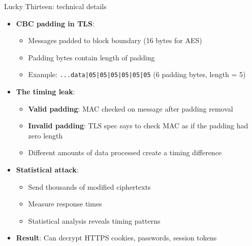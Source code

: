 \ifdefined\PRESENTATION\else\PassOptionsToClass{handout}{beamer}\fi\documentclass[aspectratio=169, lualatex]{beamer}
\begin{document}
\begin{frame}{Lucky Thirteen: technical details}
	\begin{itemize}
		\item \textbf{CBC padding in TLS}:
		      \begin{itemize}
			      \item Messages padded to block boundary (16 bytes for AES)
			      \item Padding bytes contain length of padding
			      \item Example: \texttt{...data|05|05|05|05|05|05} (6 padding bytes, length = 5)
		      \end{itemize}
		\item \textbf{The timing leak}:
		      \begin{itemize}
			      \item \textbf{Valid padding}: MAC checked on message after padding removal
			      \item \textbf{Invalid padding}: TLS spec says to check MAC as if the padding had zero length
			      \item Different amounts of data processed create a timing difference
		      \end{itemize}
		\item \textbf{Statistical attack}:
		      \begin{itemize}
			      \item Send thousands of modified ciphertexts
			      \item Measure response times
			      \item Statistical analysis reveals timing patterns
		      \end{itemize}
		\item \textbf{Result}: Can decrypt HTTPS cookies, passwords, session tokens
	\end{itemize}
\end{frame}
\end{document}
